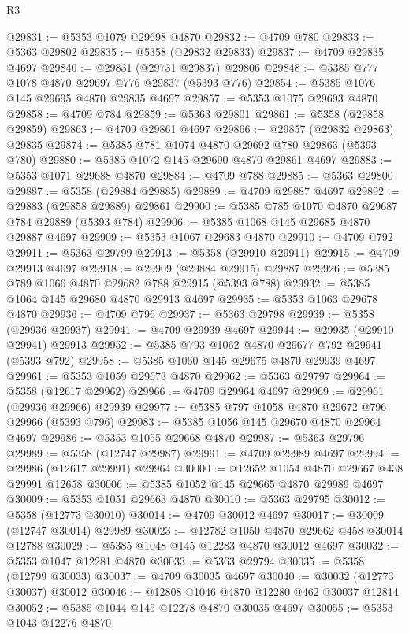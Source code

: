 \begin{lexlean}{R3}
\begin{coremodule}
@29831 := @5353 @1079 @29698 @4870
@29832 := @4709 @780
@29833 := @5363 @29802
@29835 := @5358 (@29832 @29833)
@29837 := @4709 @29835 @4697
@29840 := @29831 (@29731 @29837) @29806
@29848 := @5385 @777 @1078 @4870 @29697 @776 @29837 (@5393 @776)
@29854 := @5385 @1076 @145 @29695 @4870 @29835 @4697
@29857 := @5353 @1075 @29693 @4870
@29858 := @4709 @784
@29859 := @5363 @29801
@29861 := @5358 (@29858 @29859)
@29863 := @4709 @29861 @4697
@29866 := @29857 (@29832 @29863) @29835
@29874 := @5385 @781 @1074 @4870 @29692 @780 @29863 (@5393 @780)
@29880 := @5385 @1072 @145 @29690 @4870 @29861 @4697
@29883 := @5353 @1071 @29688 @4870
@29884 := @4709 @788
@29885 := @5363 @29800
@29887 := @5358 (@29884 @29885)
@29889 := @4709 @29887 @4697
@29892 := @29883 (@29858 @29889) @29861
@29900 := @5385 @785 @1070 @4870 @29687 @784 @29889 (@5393 @784)
@29906 := @5385 @1068 @145 @29685 @4870 @29887 @4697
@29909 := @5353 @1067 @29683 @4870
@29910 := @4709 @792
@29911 := @5363 @29799
@29913 := @5358 (@29910 @29911)
@29915 := @4709 @29913 @4697
@29918 := @29909 (@29884 @29915) @29887
@29926 := @5385 @789 @1066 @4870 @29682 @788 @29915 (@5393 @788)
@29932 := @5385 @1064 @145 @29680 @4870 @29913 @4697
@29935 := @5353 @1063 @29678 @4870
@29936 := @4709 @796
@29937 := @5363 @29798
@29939 := @5358 (@29936 @29937)
@29941 := @4709 @29939 @4697
@29944 := @29935 (@29910 @29941) @29913
@29952 := @5385 @793 @1062 @4870 @29677 @792 @29941 (@5393 @792)
@29958 := @5385 @1060 @145 @29675 @4870 @29939 @4697
@29961 := @5353 @1059 @29673 @4870
@29962 := @5363 @29797
@29964 := @5358 (@12617 @29962)
@29966 := @4709 @29964 @4697
@29969 := @29961 (@29936 @29966) @29939
@29977 := @5385 @797 @1058 @4870 @29672 @796 @29966 (@5393 @796)
@29983 := @5385 @1056 @145 @29670 @4870 @29964 @4697
@29986 := @5353 @1055 @29668 @4870
@29987 := @5363 @29796
@29989 := @5358 (@12747 @29987)
@29991 := @4709 @29989 @4697
@29994 := @29986 (@12617 @29991) @29964
@30000 := @12652 @1054 @4870 @29667 @438 @29991 @12658
@30006 := @5385 @1052 @145 @29665 @4870 @29989 @4697
@30009 := @5353 @1051 @29663 @4870
@30010 := @5363 @29795
@30012 := @5358 (@12773 @30010)
@30014 := @4709 @30012 @4697
@30017 := @30009 (@12747 @30014) @29989
@30023 := @12782 @1050 @4870 @29662 @458 @30014 @12788
@30029 := @5385 @1048 @145 @12283 @4870 @30012 @4697
@30032 := @5353 @1047 @12281 @4870
@30033 := @5363 @29794
@30035 := @5358 (@12799 @30033)
@30037 := @4709 @30035 @4697
@30040 := @30032 (@12773 @30037) @30012
@30046 := @12808 @1046 @4870 @12280 @462 @30037 @12814
@30052 := @5385 @1044 @145 @12278 @4870 @30035 @4697
@30055 := @5353 @1043 @12276 @4870

\end{coremodule}
\end{lexlean}
